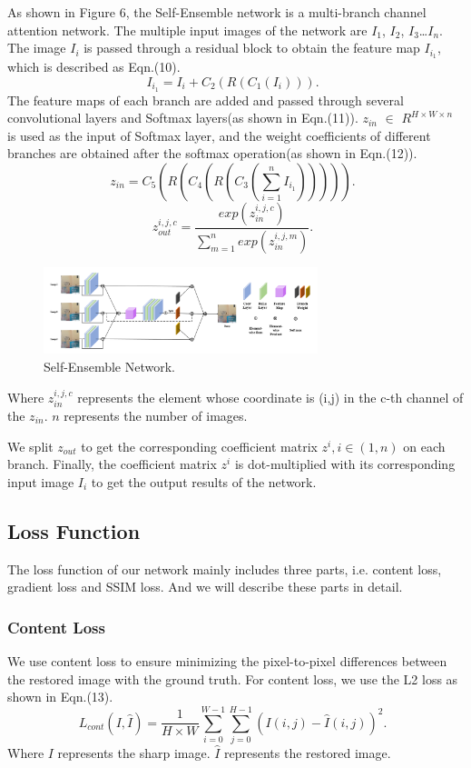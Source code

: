 \begin{sloppypar}
As shown in Figure 6, the Self-Ensemble network is a multi-branch channel attention network. The multiple input images of the network are $I_1$, $I_2$, $I_3$…$I_n$. The image $I_i$ is passed through a residual block to obtain the feature map $I_{i_1}$, which is described as Eqn.(10).
\begin{equation}
	    I_{i_1}  =  I_i + C_2(R(C_1(I_i))). \enspace
\end{equation}
The feature maps of each branch are added and passed through several convolutional layers and Softmax layers(as shown in Eqn.(11)). $z_{in}$ $\in$ $R^{H \times W \times n}$ is used as the input of Softmax layer, and the weight coefficients of different branches are obtained after the softmax operation(as shown in Eqn.(12)).
\begin{equation}
	    z_{in}  =  C_5(R(C_4(R(C_3(\sum_{i=1}^{n}I_{i_1}))))). \enspace
\end{equation}
\begin{equation}
	    z_{out}^{i,j,c}  =  \frac{exp(z_{in}^{i,j,c})}{\sum_{m=1}^{n}{exp(z_{in}^{i,j,m})}}. \enspace
\end{equation}
\begin{figure}[h]
\centering
\includegraphics[width=8cm]{images/fig7.png}
\caption{Self-Ensemble Network.}
\label{fig_sim}
\end{figure}
Where $z_{in}^{i,j,c}$ represents the element whose coordinate is (i,j) in the c-th channel of the $z_{in}$. $n$ represents the number of images.

We split $z_{out}$ to get the corresponding coefficient matrix $z^i, i \in (1,n)$ on each branch. Finally, the coefficient matrix $z^i$ is dot-multiplied with its corresponding input image $I_i$ to get the output results of the network.
\subsection{Loss Function}
The loss function of our network mainly includes three parts, i.e. content loss, gradient loss and SSIM loss. And we will describe these parts in detail.
\subsubsection{Content Loss}
We use  content loss to ensure minimizing the pixel-to-pixel differences between the restored image with the ground truth. For content loss, we use the L2 loss as shown in Eqn.(13).
\begin{equation}
	    L_{cont}(I, \hat{I})  =  \frac{1}{H \times W} \sum_{i=0}^{W-1}\sum_{j=0}^{H-1}(I(i,j) - \hat{I}(i, j))^2. \enspace
\end{equation}
Where $I$ represents the sharp image. $\hat{I}$ represents the restored image.

\end{sloppypar}
